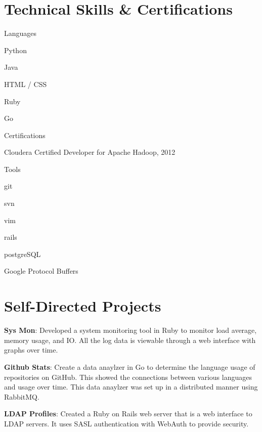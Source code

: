 \documentclass[a4paper,margin,line]{resume}
\begin{document}
\begin{resume}
\section{\mysidestyle Technical Skills \& Certifications}
	\begin{compactdesc}
		\item[Languages] \begin{inparaenum} { \small
			\item Python
			\item Java
			\item HTML / CSS
			\item Ruby
			\item Go
		} \end{inparaenum}
        \item[Certifications] \begin{inparaenum} { \small
            \item Cloudera Certified Developer for Apache Hadoop, 2012    
        } \end{inparaenum}
		\item[Tools] \begin{inparaenum} { \small
			\item git
            \item svn
            \item vim
            \item rails
            \item postgreSQL
            \item Google Protocol Buffers
		} \end{inparaenum}
	\end{compactdesc}

\section{\mysidestyle Self-Directed Projects}
    \begin{asparablank}
        \item \textbf{Sys Mon}: Developed a system monitoring tool in Ruby to monitor 
            load average, memory usage, and IO. All the log 
            data is viewable through a web interface with graphs over time.
        \item \textbf{Github Stats}: Create a data anaylzer in Go to determine the language
            usage of repositories on GitHub. This showed the connections between
            various languages and usage over time. This data anaylzer was set up in a
            distributed manner using RabbitMQ.
        \item \textbf{LDAP Profiles}: Created a Ruby on Rails web server that is a web 
            interface to LDAP servers. It uses SASL authentication with WebAuth 
            to provide security.
    \end{asparablank}

\end{resume}
\end{document}
